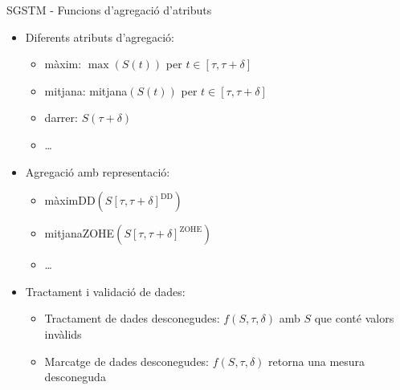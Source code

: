 \begin{frame}{SGSTM - Funcions d'agregació d'atributs}



\begin{itemize}
  \item Diferents atributs d'agregació: 
    \begin{itemize}
    \item màxim: $\max(S(t))$ per $t\in[\tau,\tau+\delta]$
    \item mitjana: mitjana$(S(t))$ per $t\in[\tau,\tau+\delta]$
    \item darrer: $S(\tau+\delta)$
    \item \dots
    \end{itemize}
  \item Agregació amb representació: 
    \begin{itemize}
     \item màximDD$(S[\tau,\tau+\delta]^{\text{DD}})$
     \item mitjanaZOHE$(S[\tau,\tau+\delta]^{\text{ZOHE}})$
     \item \dots
    \end{itemize}

  \item Tractament i validació de dades:
    \begin{itemize}
    \item Tractament de dades desconegudes: $f(S,\tau,\delta)$ amb $S$ que conté valors invàlids
    \item Marcatge de dades desconegudes: $f(S,\tau,\delta)$ retorna
      una mesura desconeguda
    \end{itemize}
  \end{itemize}


\end{frame}



